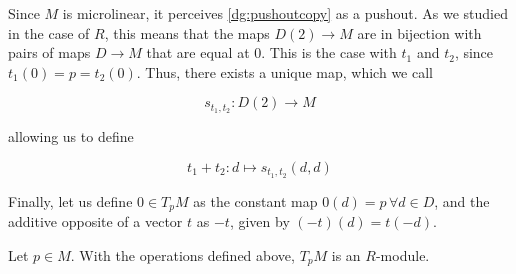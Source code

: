 Since \( M \) is microlinear, it perceives \ref{dg:pushoutcopy} as a pushout. As we studied in the case of \( R \), this means that the maps \( D(2)\to M \) are in bijection with pairs of maps \( D\to M \) that are equal at \( 0 \). This is the case with \( t_1 \) and \( t_2 \), since \( t_1(0)=p=t_2(0) \). Thus, there exists a unique map, which we call

\begin{equation*}
  s_{t_1,t_2}:D(2)\to M
\end{equation*}

allowing us to define

\begin{equation*}
  t_1+t_2:d\mapsto s_{t_1,t_2}(d,d)
\end{equation*}

Finally, let us define \( 0\in T_pM \) as the constant map \( 0(d)=p \,\forall d\in D \), and the additive opposite of a vector \( t \) as \( -t \), given by \( (-t)(d) = t(-d) \).

\begin{proposition}
  Let \( p\in M \). With the operations defined above, \( T_pM \) is an \( R \)-module.
\end{proposition}

